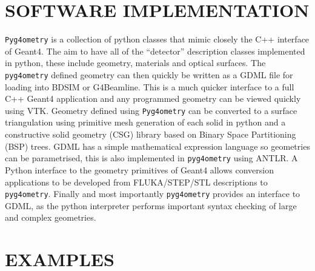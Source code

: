 \documentclass[a4paper,
               keeplastbox,   %
               ]{jacow}
\begin{document}
\section{SOFTWARE IMPLEMENTATION}
\verb|Pyg4ometry| is a collection of python classes that mimic closely the C++ interface of Geant4. The aim to have all of the ``detector'' description classes implemented in python, these include geometry, materials and optical surfaces. The \verb|pyg4ometry| defined geometry can then quickly be written as a GDML file for loading into BDSIM or G4Beamline. This is a much quicker interface to a full C++ Geant4 application and any programmed geometry can be viewed quickly using VTK. Geometry defined using \verb|Pyg4ometry| can be converted to a surface triangulation using primitive mesh generation of each solid in python and a constructive solid geometry (CSG) library based on Binary Space Partitioning (BSP) trees. GDML has a simple mathematical expression language so geometries can be parametrised, this is also implemented in \verb|pyg4ometry| using ANTLR. A Python interface to the geometry primitives of Geant4 allows conversion applications to be developed from FLUKA/STEP/STL descriptions to \verb|pyg4ometry|. Finally and most importantly \verb|pyg4ometry| provides an interface to GDML, as the python interpreter performs important syntax checking of large and complex geometries. 

\section{EXAMPLES}
\end{document}
